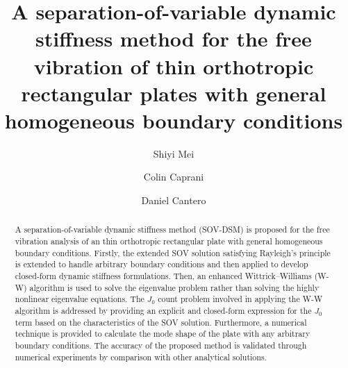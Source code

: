 \documentclass[preprint,12pt,number]{elsarticle}
\begin{document}
\onehalfspacing  %

\begin{frontmatter}
\title{A separation-of-variable dynamic stiffness method for the free vibration of thin orthotropic rectangular plates with general homogeneous boundary conditions}
\author[1]{Shiyi Mei\corref{}}
\author[1]{Colin Caprani}
\author[2]{Daniel Cantero}
\begin{abstract}
	A separation-of-variable dynamic stiffness method (SOV-DSM) is proposed for the free vibration analysis of an thin orthotropic rectangular plate with general homogeneous boundary conditions.  
	Firstly, the extended SOV solution satisfying Rayleigh’s principle is extended to handle arbitrary boundary conditions and then applied to develop closed-form dynamic stiffness formulations.
	Then, an enhanced Wittrick–Williams (W-W) algorithm is used to solve the eigenvalue problem rather than solving the highly nonlinear eigenvalue equations.
	The $J_0$ count problem involved in applying the W-W algorithm is addressed by providing an explicit and closed-form expression for the $J_0$ term based on the characteristics of the SOV solution.
	Furthermore, a numerical technique is provided to calculate the mode shape of the plate with any arbitrary boundary conditions.
	The accuracy of the proposed method is validated through numerical experiments by comparison with other analytical solutions.
\end{abstract}
\end{frontmatter}

\linenumbers
\end{document}
